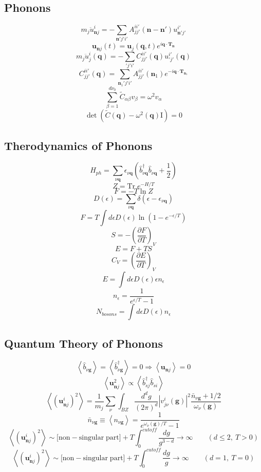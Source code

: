 \documentclass[12pt]{extarticle}
\newcommand{\average}[1]{\ensuremath{\left\langle #1 \right\rangle}}
\newcommand{\parentheses}[1]{\ensuremath{\left( #1 \right)}}
\newcommand{\absolutevalue}[1]{\ensuremath{\left| #1 \right|}}
\newcommand{\creation}[1]{\hat{#1}^{\dagger}}
\begin{document}
\begin{multicols*}{2}
\subsection{Phonons}
$$m_j \ddot{u}_{\mathbf{n}j}^i = - \sum_{\mathbf{n}'j'i'} A_{jj'}^{ii'}(\mathbf{n}-\mathbf{n}') u^{i'}_{\mathbf{n}'j'}$$
$$\mathbf{u}_{\mathbf{n}j}(t)=\mathbf{u}_j(\mathbf{q},t) e^{i \mathbf{q} \cdot \mathbf{T}_\mathbf{n}}$$
$$m_j \ddot{u}_{j}^i (\mathbf{q}) = - \sum_{'j'i'} C_{jj'}^{ii'}(\mathbf{q}) u^{i'}_{'j'}(\mathbf{q})$$
$$C_{jj'}^{ii'}(\mathbf{q})=\sum_{\mathbf{n}_1'j'i'} A_{jj'}^{ii'}(\mathbf{n}_1) e^{-i \mathbf{q} \cdot \mathbf{T}_{\mathbf{n}_1}}$$
$$\sum_{\beta=1}^{d\nu_0} \tilde{C}_{\alpha \beta} v_{\beta} = \omega^ 2 v_{\alpha}$$
$$\det \parentheses{\tilde{C}(\mathbf{q})-\omega^2(\mathbf{q}) \mathrm{I}}=0$$

\subsection{Therodynamics of Phonons}
$$H_{ph}= \sum_{\nu \mathbf{q}} \epsilon_{\nu \mathbf{q}} \parentheses{\creation{b}_{\nu \mathbf{q}} \hat{b}_{\nu \mathbf{q}} + \dfrac{1}{2}}$$
$$Z= \mathrm{Tr} \; e^{-H/T}$$
$$F=-T \ln Z$$
$$D(\epsilon)=\sum_{\nu \mathbf{q}} \delta \parentheses{\epsilon - \epsilon_{\nu \mathbf{q}}}$$
$$F=T \int d\epsilon D(\epsilon) \ln \parentheses{1-e^{-\epsilon/T}}$$
$$S = -\parentheses{\dfrac{\partial F}{\partial T}}_{V}$$
$$E = F + TS$$
$$C_V = \parentheses{\dfrac{\partial E}{\partial T}}_{V}$$
$$E= \int d\epsilon D(\epsilon) \epsilon n_{\epsilon}$$
$$n_{\epsilon}=\dfrac{1}{e^{\epsilon/T}-1}$$
$$N_{bosons}= \int d\epsilon D(\epsilon) n_{\epsilon}$$

\subsection{Quantum Theory of Phonons}
$$\average{\hat{b}_{\nu \mathbf{g}}}=\average{\creation{b}_{\nu \mathbf{g}}}=0 \Longrightarrow \average{\mathbf{u}_{\mathbf{n}j}}=0$$
$$\average{\mathbf{u}_{\mathbf{n}j}^2} \propto \average{\creation{b}_{sj} \hat{b}_{si}}$$
$$\average{\parentheses{\mathbf{u}_{\mathbf{n}j}^i}^2} = \dfrac{1}{m_j}\sum_\nu \int_{BZ} \dfrac{d^dg}{(2\pi)^d} \absolutevalue{v_{j\nu}^i(\mathbf{g})}^2 \dfrac{\bar{n}_{\nu \mathbf{g}}+1/2}{\omega_\nu (\mathbf{g})}$$
$$\bar{n}_{\nu \mathbf{g}} \equiv \average{n_{\nu \mathbf{g}}}=\dfrac{1}{e^{\omega_\nu (\mathbf{g})/T}-1}$$
$$\average{\parentheses{\mathbf{u}_{\mathbf{n}j}^i}^2} \sim [\mathrm{non-singular \; part]} + T \int_0^{cutoff} \dfrac{dg}{g^{3-d}} \rightarrow \infty \qquad \parentheses{d \leq 2, \: T > 0}$$
$$\average{\parentheses{\mathbf{u}_{\mathbf{n}j}^i}^2} \sim [\mathrm{non-singular \; part]} + T \int_0^{cutoff} \dfrac{dg}{g} \rightarrow \infty \qquad \parentheses{d = 1, \: T = 0}$$


\end{multicols*}
\end{document}

